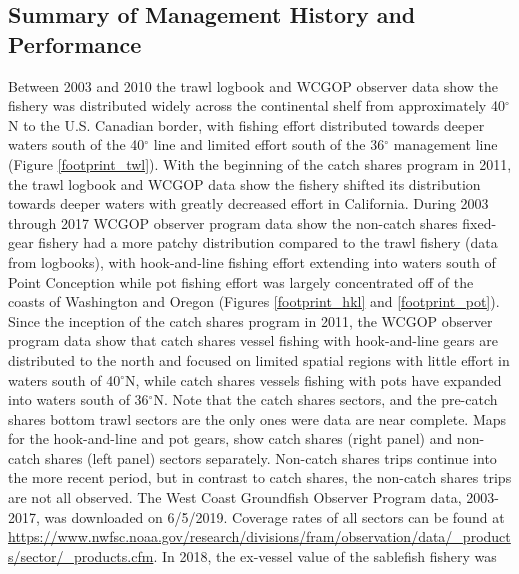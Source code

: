 \documentclass[11pt,
  english,
  a4paper,
]{article}
\begin{document}
\leavevmode\tagmcend\tagstructend\par


\hypertarget{summary-of-management-history-and-performance}{%
\subsection{Summary of Management History and Performance}\label{summary-of-management-history-and-performance}}

\leavevmode\tagmcend\tagstructend


Between 2003 and 2010 the trawl logbook and WCGOP observer data show the fishery was distributed widely across the continental shelf from approximately 40{\(^{\circ}\)\leavevmode\tagmcend\tagstructend}N to the U.S. Canadian border, with fishing effort distributed towards deeper waters south of the 40{\(^{\circ}\)\leavevmode\tagmcend\tagstructend} line and limited effort south of the 36{\(^{\circ}\)\leavevmode\tagmcend\tagstructend} management line (Figure \ref{footprint_twl}). With the beginning of the catch shares program in 2011, the trawl logbook and WCGOP data show the fishery shifted its distribution towards deeper waters with greatly decreased effort in California. During 2003 through 2017 WCGOP observer program data show the non-catch shares fixed-gear fishery had a more patchy distribution compared to the trawl fishery (data from logbooks), with hook-and-line fishing effort extending into waters south of Point Conception while pot fishing effort was largely concentrated off of the coasts of Washington and Oregon (Figures \ref{footprint_hkl} and \ref{footprint_pot}). Since the inception of the catch shares program in 2011, the WCGOP observer program data show that catch shares vessel fishing with hook-and-line gears are distributed to the north and focused on limited spatial regions with little effort in waters south of 40{\(^{\circ}\)\leavevmode\tagmcend\tagstructend}N, while catch shares vessels fishing with pots have expanded into waters south of 36{\(^{\circ}\)\leavevmode\tagmcend\tagstructend}N. Note that the catch shares sectors, and the pre-catch shares bottom trawl sectors are the only ones were data are near complete. Maps for the hook-and-line and pot gears, show catch shares (right panel) and non-catch shares (left panel) sectors separately. Non-catch shares trips continue into the more recent period, but in contrast to catch shares, the non-catch shares trips are not all observed. The West Coast Groundfish Observer Program data, 2003-2017, was downloaded on 6/5/2019. Coverage rates of all sectors can be found at {\url{https://www.nwfsc.noaa.gov/research/divisions/fram/observation/data/_products/sector/_products.cfm}\leavevmode\tagmcend\tagstructend}. In 2018, the ex-vessel value of the sablefish fishery was 
\end{document}
